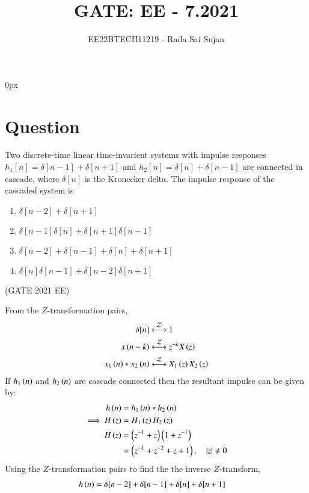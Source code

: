 \documentclass[journal,12pt,twocolumn]{IEEEtran}
\theoremstyle{remark}
\begin{document}
\parindent 0px

\title{GATE: EE - 7.2021}
\author{EE22BTECH11219 - Rada Sai Sujan$^{}$%
}
\maketitle
\newpage
\bigskip
\section*{Question}
Two discrete-time linear time-invarient systems with impulse responses $h_1[n]=\delta[n-1]+\delta[n+1]$ and $h_2[n]=\delta[n]+\delta[n-1]$ are connected in cascade, where $\delta[n]$ is the Kronecker delta. The impulse response of the cascaded system is   \\
\begin{enumerate}[label=(\alph*)]
    \item $\delta[n-2]+\delta[n+1]$
    \item $\delta[n-1]\delta[n]+\delta[n+1]\delta[n-1]$
    \item $\delta[n-2]+\delta[n-1]+\delta[n]+\delta[n+1]$
    \item $\delta[n]\delta[n-1]+\delta[n-2]\delta[n+1]$
\end{enumerate} \hfill(GATE 2021 EE)\\
\solution

From the $Z$-transformation pairs,
\begin{align}
    \delta[n] &\overset{\mathcal{Z}}{ \longleftrightarrow} 1  \label{eqn:g22ee7.1}  \\
    x\left(n-k\right) &\overset{\mathcal{Z}}{ \longleftrightarrow} z^{-k}X\left(z\right) \label{eqn:g22ee7.2}   \\
    x_1\left(n\right)\ast x_2\left(n\right) &\overset{\mathcal{Z}}{ \longleftrightarrow} X_1\left(z\right)X_2\left(z\right) \label{eqn:g22ee7.3}
\end{align}
If $h_1\left(n\right)$ and $h_2\left(n\right)$ are cascade connected then the resultant impulse can be given by:
\begin{align}
    h\left(n\right)&=h_1\left(n\right)\ast h_2\left(n\right)    \\
    \implies H\left(z\right)&=H_1\left(z\right)H_2\left(z\right)    \\
    H\left(z\right)&=\left(z^{-1}+z\right)\left(1+z^{-1}\right)   \\
    &=\left(z^{-1}+z^{-2}+z+1\right), \quad \left\vert z\right\vert\neq 0
\end{align}
Using the $Z$-transformation pairs to find the the inverse $Z$-transform,
\begin{align}
    h\left(n\right)&=\delta[n-2]+\delta[n-1]+\delta[n]+\delta[n+1]
\end{align}
\end{document}

